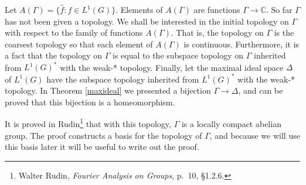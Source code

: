 \documentclass{article}
\begin{document}
Let $A(\Gamma)=\{\hat{f}:f \in L^1(G)\}$. Elements of $A(\Gamma)$ are functions $\Gamma \to \mathbb{C}$. So far
$\Gamma$ has not been given  a topology. We shall be interested in the initial topology on $\Gamma$ with respect to
the family of functions $A(\Gamma)$. That is, the topology on $\Gamma$ is the coarsest topology so that each element of
$A(\Gamma)$ is continuous. 
Furthermore, it is a fact that the topology on $\Gamma$ is equal to the subspace topology on $\Gamma$ inherited
from $L^1(G)^*$ with the weak-* topology. Finally,
let the maximal ideal space $\Delta$ of $L^1(G)$ have the subspace topology inherited from
$L^1(G)^*$ with the weak-* topology. In Theorem \ref{maxideal} we presented a bijection 
$\Gamma \to \Delta$, and can be proved that this bijection is a homeomorphism.

It is proved in Rudin\footnote{Walter
Rudin, {\em Fourier Analysis on Groups}, p.~10, \S 1.2.6.} that with this topology, $\Gamma$ is a locally compact abelian group. 
The proof constructs a basis for the topology of $\Gamma$, and because we will use this basis later it will be useful to write out the proof.
\end{document}
